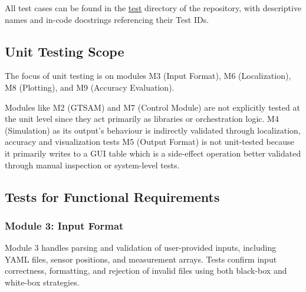 \documentclass[12pt, titlepage]{article}
\begin{document}
All test cases can be found in the \hyperlink{https://github.com/AliyahJimoh/2D-Localizer/tree/main/test}{test} directory of the repository, with descriptive names and in-code docstrings referencing their Test IDs.

\subsection{Unit Testing Scope}


The focus of unit testing is on modules M3 (Input Format), M6 (Localization), M8 (Plotting), and M9 (Accuracy Evaluation).

Modules like M2 (GTSAM) and M7 (Control Module) are not explicitly tested at the unit level since they act primarily as libraries or orchestration logic. M4 (Simulation) as its output's behaviour is indirectly validated through localization, accuracy and visualization tests M5 (Output Format) is not unit-tested because it primarily writes to a GUI table which is a side-effect operation better validated through manual inspection or system-level tests.

\subsection{Tests for Functional Requirements}


\subsubsection{Module 3: Input Format}

Module 3 handles parsing and validation of user-provided inputs, including YAML files, sensor positions, and measurement arrays. Tests confirm input correctness, formatting, and rejection of invalid files using both black-box and white-box strategies.
\end{document}
